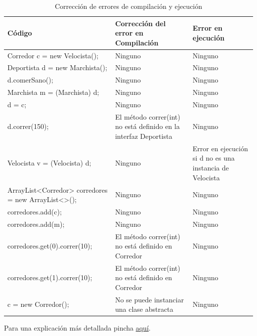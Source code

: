 \documentclass[a4paper,12pt]{article}
\begin{document}
\begin{table}[H]
    \centering
    \begin{tabular}{|p{7cm}|p{5cm}|p{3cm}|}
        \hline
        \textbf{Código} & \textbf{Corrección del error en Compilación} & \textbf{Error en ejecución} \\ \hline
        Corredor c = new Velocista(); & Ninguno & Ninguno \\ \hline
        Deportista d = new Marchista(); & Ninguno & Ninguno \\ \hline
        d.comerSano(); & Ninguno & Ninguno \\ \hline
        Marchista m = (Marchista) d; & Ninguno & Ninguno \\ \hline
        d = c; & Ninguno & Ninguno \\ \hline
        d.correr(150); & El método correr(int) no está definido en la interfaz Deportista & Ninguno \\ \hline
        Velocista v = (Velocista) d; & Ninguno & Error en ejecución si d no es una instancia de Velocista \\ \hline
        ArrayList<Corredor> corredores = new ArrayList<>(); & Ninguno & Ninguno \\ \hline
        corredores.add(c); & Ninguno & Ninguno \\ \hline
        corredores.add(m); & Ninguno & Ninguno \\ \hline
        corredores.get(0).correr(10); & El método correr(int) no está definido en Corredor & Ninguno \\ \hline
        corredores.get(1).correr(10); & El método correr(int) no está definido en Corredor & Ninguno \\ \hline
        c = new Corredor(); & No se puede instanciar una clase abstracta & Ninguno \\ \hline
    \end{tabular}
    \caption{Corrección de errores de compilación y ejecución}
\end{table}

Para una explicación más detallada pincha \href{https://github.com/ElblogdeIsmael/ElblogdeIsmael.github.io/tree/main/Subjects/Third/PDOO/Teoria/RelacionesEjercicios/Solt3/ETSIIT/explicacion_ej14.md}{aquí}.
\end{document}
